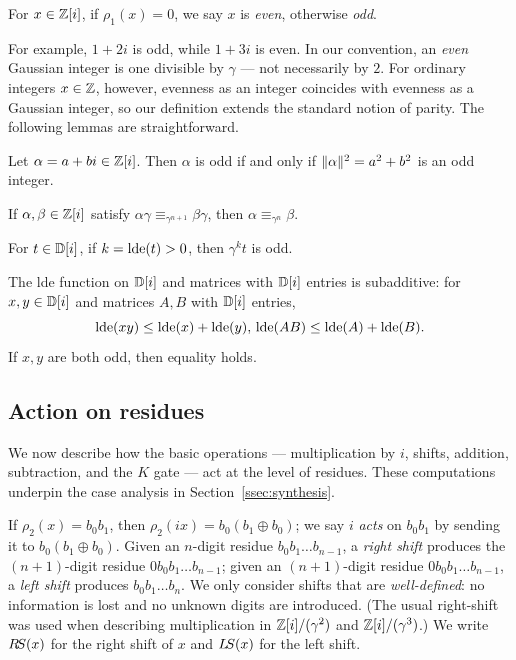 \documentclass[reprint,amsmath,amssymb,aps,pra]{revtex4-2}
\begin{document}
\begin{definition}
  For $x \in \mathbb{Z}[i]$, if $\rho_1(x) = 0$, we say $x$ is \emph{even},
  otherwise \emph{odd}.
\end{definition}

For example, $1+2i$ is odd, while $1+3i$ is even. In our convention,
an \emph{even} Gaussian integer is one divisible by $\gamma$ — not
necessarily by $2$. For ordinary integers $x \in \mathbb{Z}$, however,
evenness as an integer coincides with evenness as a Gaussian integer,
so our definition extends the standard notion of parity. The
following lemmas are straightforward.

\begin{lemma}
  \label{lem:parity-dagger-norm}
  Let $\alpha =a+bi \in \mathbb{Z} [i]$. Then $\alpha$ is odd if and only if
  $\|\alpha\|^2=a^2+b^2$ is an odd integer.
\end{lemma}

\begin{lemma}
  \label{lem:cancel-gamma}
  If $\alpha,\beta \in \mathbb{Z} [i]$ satisfy
  $\alpha \gamma \equiv_{\gamma^{n+1}} \beta \gamma$, then
  $\alpha \equiv_{\gamma^n} \beta$.
\end{lemma}

\begin{lemma}
  \label{lem:k-odd}
  For $t\in {\mathbb D} [i]$, if $k = \operatorname{lde}(t)>0$, then $\gamma^kt$ is odd.
\end{lemma}

\begin{lemma}
  \label{lem:add}
  The lde function on ${\mathbb D} [i]$ and matrices with ${\mathbb D} [i]$ entries is
  subadditive: for $x, y \in {\mathbb D} [i]$ and matrices $A, B$ with ${\mathbb D} [i]$
  entries,
  \[
    \operatorname{lde}(xy) \le \operatorname{lde}(x) + \operatorname{lde}(y), \, \operatorname{lde}(AB) \le \operatorname{lde}(A) + \operatorname{lde}(B).
  \] If $x, y$ are both odd, then equality holds.
\end{lemma}

\subsection{Action on residues}

We now describe how the basic operations — multiplication by $i$,
shifts, addition, subtraction, and the $K$ gate — act at the level of
residues. These computations underpin the case analysis in
Section~\ref{ssec:synthesis}.

If $\rho_2(x) = b_0b_1$, then $\rho_2(ix) = b_0(b_1 \oplus b_0)$; we
say $i$ \emph{acts} on $b_0b_1$ by sending it to
$b_0(b_1 \oplus b_0)$. Given an $n$-digit residue
$b_0 b_1 \ldots b_{n-1}$, a \emph{right shift} produces the
$(n{+}1)$-digit residue $0 b_0 b_1 \ldots b_{n-1}$; given an
$(n{+}1)$-digit residue $0 b_0 b_1 \ldots b_{n-1}$, a \emph{left
  shift} produces $b_0 b_1 \ldots b_n$. We only consider shifts that
are \emph{well-defined}: no information is lost and no unknown digits
are introduced. (The usual right-shift was used when describing
multiplication in $\mathbb{Z} [i]/(\gamma^2)$ and $\mathbb{Z} [i]/(\gamma^3)$.)  We write
$R\kern-.16667em S(x)$ for the right shift of $x$ and $L\kern-.16667em S(x)$ for the left shift.
\end{document}
